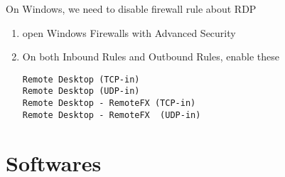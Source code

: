 On Windows, we need to disable firewall rule about RDP
\begin{enumerate}
  \item open Windows Firewalls with Advanced Security
  
  \item On both Inbound Rules and Outbound Rules, enable these
\begin{verbatim}
Remote Desktop (TCP-in)
Remote Desktop (UDP-in)
Remote Desktop - RemoteFX (TCP-in)
Remote Desktop - RemoteFX  (UDP-in) 
\end{verbatim}
\end{enumerate}

\section{Softwares}

